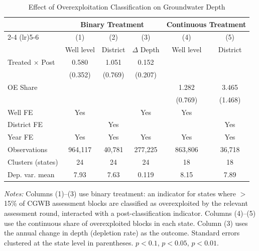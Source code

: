 \begin{table}[htbp]
\centering
\caption{Effect of Overexploitation Classification on Groundwater Depth}
\label{tab:main}
\begin{threeparttable}
\begin{tabular}{lccccc}
\toprule
& \multicolumn{3}{c}{Binary Treatment} & \multicolumn{2}{c}{Continuous Treatment} \\
\cmidrule(lr){2-4} \cmidrule(lr){5-6}
& (1) & (2) & (3) & (4) & (5) \\
& Well level & District & $\Delta$ Depth & Well level & District \\
\midrule
Treated $\times$ Post & 0.580 & 1.051 & 0.152 & & \\
& (0.352) & (0.769) & (0.207) & & \\
\addlinespace
OE Share & & & & 1.282 & 3.465 \\
& & & & (0.769) & (1.468) \\
\addlinespace
\midrule
Well FE & Yes & & Yes & Yes & \\
District FE & & Yes & & & Yes \\
Year FE & Yes & Yes & Yes & Yes & Yes \\
\addlinespace
Observations & 964,117 & 40,781 & 277,225 & 863,806 & 36,718 \\
Clusters (states) & 24 & 24 & 24 & 18 & 18 \\
Dep. var. mean & 7.93 & 7.63 & 0.119 & 8.15 & 7.89 \\
\bottomrule
\end{tabular}
\begin{tablenotes}[flushleft]
\small
\item \textit{Notes:} Columns (1)--(3) use binary treatment: an indicator for
states where $>$15\% of CGWB assessment blocks are classified as overexploited
by the relevant assessment round, interacted with a post-classification indicator.
Columns (4)--(5) use the continuous share of overexploited blocks in each state.
Column (3) uses the annual change in depth (depletion rate) as the outcome.
Standard errors clustered at the state level in parentheses.
\sym{*} $p<0.1$, \sym{**} $p<0.05$, \sym{***} $p<0.01$.
\end{tablenotes}
\end{threeparttable}
\end{table}

